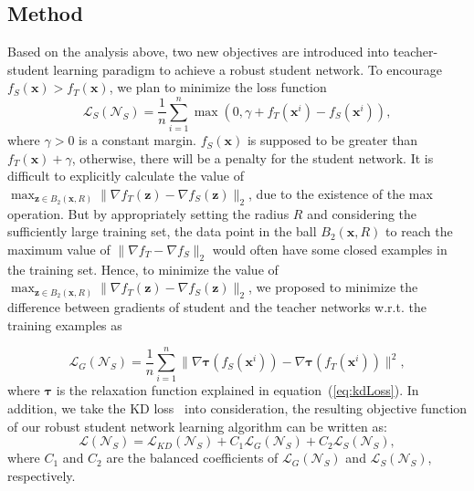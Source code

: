 \documentclass[journal]{IEEEtran}
\newcommand{\Eref}[1]{equation~(\ref{#1})}
\newcommand{\bx}{\bm{x}}
\newcommand{\bz}{\bm{z}}
\begin{document}
\subsection{Method}
Based on the analysis above, two new objectives are introduced into teacher-student learning paradigm to achieve a robust student network. To encourage $f_S(\bx)>f_T(\bx)$, we plan to minimize the loss function
\begin{equation}
  \mathcal L_S(\mathcal N_{S}) = \frac{1}{n}\sum_{i=1}^{n} \max(0,\gamma+f_T(\bx^i)-f_S(\bx^i)),
\label{eq:Sloss}
\end{equation}
where $\gamma >0$ is a constant margin. $f_S(\bx)$ is supposed to be greater than $f_T(\bx)+\gamma$, otherwise, there will be a penalty for the student network. 
It is difficult to explicitly calculate the value of $\max_{\bz\in B_2(\bx,R)}\|\nabla f_T(\bz)-\nabla f_S(\bz)\|_2$, due to the existence of the max operation. But by appropriately setting the radius $R$ and considering the sufficiently large training set, the data point in the ball $B_2(\bx,R)$ to reach the maximum value of $\|\nabla f_T - \nabla f_S\|_2$ would often have some closed examples in the training set. Hence, to minimize the value of $\max_{\bz\in B_2(\bx,R)}\|\nabla f_T(\bz)-\nabla f_S(\bz)\|_2$, we proposed to minimize the difference between gradients of student and the teacher networks w.r.t. the training examples as

\begin{equation}
  \mathcal L_G(\mathcal N_{S}) = \frac{1}{n}\sum_{i=1}^{n} \|\nabla \bm\tau(f_S(\bx^i))-\nabla \bm\tau(f_T(\bx^i))\|^2,
\label{eq:Gloss}
\end{equation}
where $\bm\tau$ is the relaxation function explained in \Eref{eq:kdLoss}. In addition, we take the KD loss~\cite{hinton2015distilling} into consideration, the resulting objective function of our robust student network learning algorithm can be written as:
\begin{equation}
  \mathcal L(\mathcal N_{S}) = \mathcal L_{KD}(\mathcal N_{S}) + C_1 \mathcal L_{G}(\mathcal N_{S}) + C_2 \mathcal L_S(\mathcal N_{S}),
\label{eq:final_loss}
\end{equation}
where $C_1$ and $C_2$ are the balanced coefficients of $\mathcal L_{G}(\mathcal N_{S})$ and $\mathcal L_{S}(\mathcal N_{S})$, respectively. 
\end{document}
